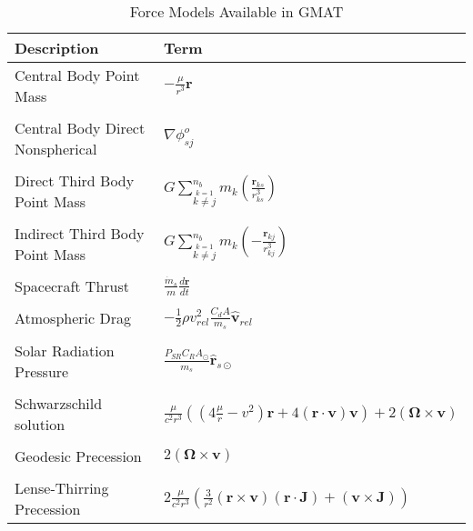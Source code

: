 \begin{table}[h]
\centering \caption{ Force Models Available in GMAT } \label{Eq:AllForces}
\begin{tabular}{p{2.0 in} p{2.75 in} }
  \hline\hline
  Description & Term \\
  \hline
  Central Body Point Mass & $ -\displaystyle\frac{\mu}{r^3}\mathbf{r}$ \\
  & \\
  Central Body Direct Nonspherical &  $\nabla \phi_{sj}^o$  \\
  & \\
  Direct Third Body Point Mass & $G\displaystyle\sum_{\stackrel{k=1}{k \neq j}}^{n_b}m_k \left(\frac{\mathbf{r}_{ks}}{r_{ks}^3}\right)$ \\
   & \\
  Indirect Third Body Point Mass &  $G\displaystyle\sum_{\stackrel{k=1}{k \neq j}}^{n_b}m_k \left( -
     \frac{\mathbf{r}_{kj} }{r_{kj}^3}   \right)$ \\
      & \\
   Spacecraft Thrust &$\displaystyle\frac{\dot{m}_s }{m}\frac{d\mathbf{r}}{dt}$\\
   &\\
   Atmospheric Drag & $- \displaystyle\frac{1}{2}\rho v_{rel}^2 \displaystyle\frac{C_d
   A}{m_s}\hat{\mathbf{v}}_{rel}$\\
   &\\
   Solar Radiation Pressure & $\displaystyle\frac{   P_{SR}C_R A_{\odot}   }{m_s}\hat{\mathbf{r}}_{s\odot}$\\
   &\\
   Schwarzschild solution & $\displaystyle\frac{\mu}{c^2 r^3}\left(  \left( 4\frac{\mu}{r} - v^2\right)\mathbf{r} +            4(\mathbf{r}\cdot\mathbf{v})\mathbf{v}\right) + 2 (\boldsymbol{\Omega} \times \mathbf{v})$\\
      &\\
   Geodesic Precession & $2 (\boldsymbol{\Omega} \times \mathbf{v}) $\\
         &\\
   Lense-Thirring Precession & $2 \displaystyle\frac{\mu}{c^2 r^3}
    \left( \frac{3}{r^2}(\mathbf{r} \times \mathbf{v})(\mathbf{r} \cdot \mathbf{J}) +(\mathbf{v}\times\mathbf{J}) \right)$\\
  \hline\hline
\end{tabular}
\end{table}
%

